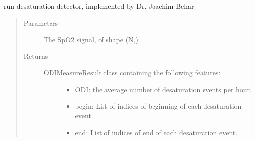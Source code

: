 \documentclass[letterpaper,10pt,english]{sphinxmanual}
\begin{document}
\begin{fulllineitems}
\begin{fulllineitems}
\begin{sphinxVerbatim}[commandchars=\\\{\}]
  

  
\end{sphinxVerbatim}

\end{fulllineitems}


\begin{fulllineitems}
\label{\detokenize{pobm.obm:pobm.obm.desat.DesaturationsMeasures.desaturation_detector}}
run desaturation detector, implemented by Dr. Joachim Behar
\begin{quote}\begin{description}
\item[{Parameters}] \leavevmode
{} \textendash{} The SpO2 signal, of shape (N,)

\item[{Returns}] \leavevmode
\begin{description}
\item[{ODIMeasureResult class containing the following features:}] \leavevmode\begin{itemize}
\item {} 
ODI: the average number of desaturation events per hour.

\item {} 
begin: List of indices of beginning of each desaturation event.

\item {} 
end: List of indices of end of each desaturation event.

\end{itemize}

\end{description}


\end{description}\end{quote}

\end{fulllineitems}


\end{fulllineitems}
\end{document}
